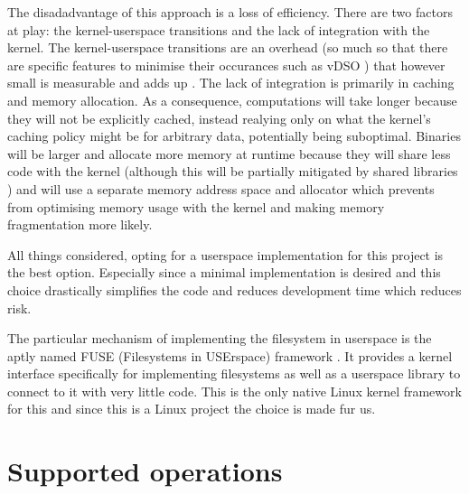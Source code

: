         The disadadvantage of this approach is a loss of efficiency. There are
        two factors at play: the kernel-userspace transitions and the lack of
        integration with the kernel. The kernel-userspace transitions are an
        overhead (so much so that there are specific features to minimise their
        occurances such as vDSO
        \cite{https://man7.org/linux/man-pages/man7/vdso.7.html}) that however
        small is measurable and adds up
        \cite{https://eli.thegreenplace.net/2018/measuring-context-switching-and-memory-overheads-for-linux-threads/}.
        The lack of integration is primarily in caching and memory allocation.
        As a consequence, computations will take longer because they will not
        be explicitly cached, instead realying only on what the kernel's
        caching policy might be for arbitrary data, potentially being
        suboptimal. Binaries will be larger and allocate more memory at runtime
        because they will share less code with the kernel (although this will
        be partially mitigated by shared libraries
        \cite{https://tldp.org/HOWTO/Program-Library-HOWTO/shared-libraries.html})
        and will use a separate memory address space and allocator which
        prevents from optimising memory usage with the kernel and making memory
        fragmentation more likely.

        All things considered, opting for a userspace implementation for this
        project is the best option. Especially since a minimal implementation
        is desired and this choice drastically simplifies the code and reduces
        development time which reduces risk.

        The particular mechanism of implementing the filesystem in userspace is
        the aptly named FUSE (Filesystems in USErspace) framework
        \cite{https://www.kernel.org/doc/html/latest/filesystems/fuse.html}. It
        provides a kernel interface specifically for implementing filesystems
        as well as a userspace library to connect to it with very little code.
        This is the only native Linux kernel framework for this and since this
        is a Linux project the choice is made fur us.

    \section{Supported operations}

